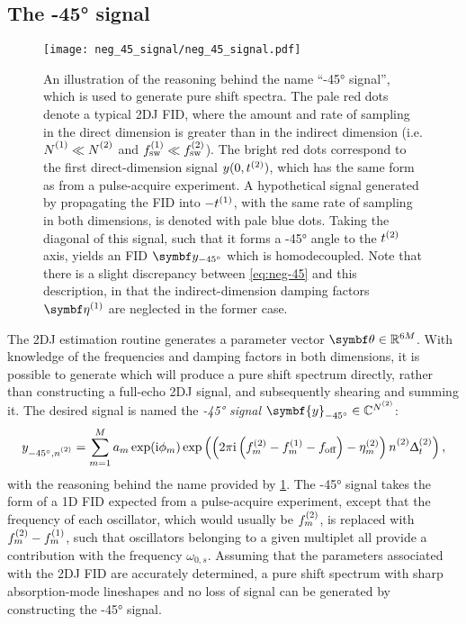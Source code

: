 \subsection{The \ang{-45} signal}
\begin{figure}
    \centering
    \texttt{[image: neg\_45\_signal/neg\_45\_signal.pdf]}
    \caption[
        An illustration of the reasoning behind the name ``\ang{-45}
        signal'' used to generate pure shift spectra.
    ]{
        An illustration of the reasoning behind the name ``\ang{-45}
        signal'', which is used to generate pure shift spectra. The pale red
        dots denote
        a typical \ac{2DJ} \ac{FID}, where
        the amount and rate of sampling in the direct dimension is greater than
        in the indirect dimension (i.e. $\None \ll \Ntwo$ and $f_{\mathrm{sw}}^{(1)} \ll
        f_{\mathrm{sw}}^{(2)}$). The bright red dots correspond to the first direct-dimension
        signal $y(0,t^{(2)})$, which has the same form as
         from a pulse-acquire experiment. A hypothetical signal
        generated by propagating the \ac{FID} into $-t^{(1)}$, with the same rate
        of sampling in both dimensions, is denoted with pale blue dots. Taking
        the diagonal of this signal, such that it forms a \ang{-45} angle to the
        $t^{(2)}$ axis, yields an \ac{FID} $\by_{\ang{-45}}$  which is
        homodecoupled. Note that there is a slight discrepancy
        between \cref{eq:neg-45} and this description, in that the
        indirect-dimension damping factors $\bdetaone$ are neglected in the
        former case.
    }
    \label{fig:neg-45}
\end{figure}
The \ac{2DJ} estimation routine generates a parameter vector $\bth \in
\mathbb{R}^{6M}$. With
knowledge of the frequencies and damping factors in both dimensions, it is
possible to generate  which will produce a pure shift spectrum
directly, rather than constructing a full-echo \ac{2DJ} signal, and
subsequently shearing and summing it. The desired signal is named
the \emph{\ang{-45} signal} $\symbf{y}_{\ang{-45}} \in \mathbb{C}^{\Ntwo}$:
\begin{equation}
    y_{\ang{-45},\ntwo} =
        \sum_{m=1}^{M} a_m \exp (\iu \phi_m)
        \exp\left(\left(2 \pi \iu \left(\ftwo_m - \fone_m - \foff\right)
                - \etatwo_m
            \right) \ntwo \Dttwo
        \right),
    \label{eq:neg-45}
\end{equation}
with the reasoning behind the name provided by \cref{fig:neg-45}.
The \ang{-45} signal
takes the form of a \ac{1D} \ac{FID} expected from a pulse-acquire experiment,
except that the frequency of each oscillator, which would usually be $f^{(2)}_m$,
is replaced with $f^{(2)}_m - f^{(1)}_m$, such that oscillators belonging to a
given multiplet all provide a contribution with the frequency $\omega_{0,s}$.
Assuming that the parameters associated with the \ac{2DJ}
\ac{FID} are accurately determined, a pure shift spectrum with sharp
absorption-mode lineshapes and no loss of signal can be generated by
constructing the \ang{-45} signal.


